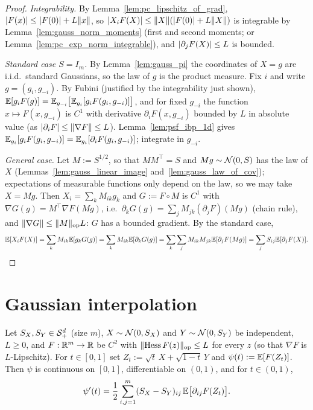 \begin{proof}
\leanok
{}
\emph{Integrability.} By Lemma~\ref{lem:pc_lipschitz_of_grad}, $\lvert F(x) \rvert\le\lvert F(0) \rvert+L\lVert x \rVert$,
so $\lvert X_iF(X) \rvert\le\lVert X \rVert(\lvert F(0) \rvert+L\lVert X \rVert)$ is integrable by
Lemma~\ref{lem:gauss_norm_moments} (first and second moments; or
Lemma~\ref{lem:pc_exp_norm_integrable}), and $\lvert \partial_jF(X) \rvert\le L$ is bounded.

\emph{Standard case $S = I_m$.} By Lemma~\ref{lem:gauss_pi} the coordinates of $X = g$ are
i.i.d.\ standard Gaussians, so the law of $g$ is the product measure. Fix $i$ and write
$g = (g_i, g_{-i})$. By Fubini (justified by the integrability just shown),
$\mathbb{E}[g_iF(g)] = \mathbb{E}_{g_{-i}}\big[\mathbb{E}_{g_i}[g_i F(g_i,g_{-i})]\big]$, and for fixed $g_{-i}$ the
function $x\mapsto F(x,g_{-i})$ is $C^1$ with derivative $\partial_iF(x,g_{-i})$ bounded by
$L$ in absolute value (as $\lvert \partial_iF \rvert\le\lVert \nabla F \rVert\le L$). Lemma~\ref{lem:psf_ibp_1d}
gives $\mathbb{E}_{g_i}[g_iF(g_i,g_{-i})] = \mathbb{E}_{g_i}[\partial_iF(g_i,g_{-i})]$; integrate in $g_{-i}$.

\emph{General case.} Let $M := S^{1/2}$, so that $MM^\top = S$ and $Mg\sim\mathcal{N}(0,S)$ has the
law of $X$ (Lemmas~\ref{lem:gauss_linear_image} and~\ref{lem:gauss_law_of_cov}); expectations
of measurable functions only depend on the law, so we may take $X = Mg$. Then
$X_i = \sum_k M_{ik}g_k$ and $G := F\circ M$ is $C^1$ with
$\nabla G(g) = M^\top\nabla F(Mg)$, i.e.\ $\partial_kG(g) = \sum_j M_{jk}(\partial_jF)(Mg)$
(chain rule), and $\lVert \nabla G \rVert\le\lVert M \rVert_{\mathrm{op}}L$: $G$ has a bounded gradient. By
the standard case,
\[
  \mathbb{E}[X_iF(X)] = \sum_k M_{ik}\mathbb{E}[g_kG(g)] = \sum_k M_{ik}\mathbb{E}[\partial_kG(g)]
  = \sum_k\sum_j M_{ik}M_{jk}\mathbb{E}[\partial_jF(Mg)] = \sum_j S_{ij}\mathbb{E}[\partial_jF(X)].
\]
\end{proof}

\section{Gaussian interpolation}
\label{sec:pre_sudakov_interp}

\begin{lemma}\label{lem:interpolation_derivative}
\leanok
{}
Let $S_X, S_Y \in \mathcal{S}_{+}^{d}$ (size $m$), $X\sim\mathcal{N}(0,S_X)$ and $Y\sim\mathcal{N}(0,S_Y)$ be
independent, $L\ge0$, and $F : \mathbb{R}^m\to\mathbb{R}$ be $C^2$ with
$\lVert \mathrm{Hess}\,F(z) \rVert_{\mathrm{op}}\le L$ for every $z$ (so that $\nabla F$ is
$L$-Lipschitz). For $t\in[0,1]$ set
$Z_t := \sqrt t\,X + \sqrt{1-t}\,Y$ and $\psi(t) := \mathbb{E}[F(Z_t)]$. Then $\psi$ is continuous on
$[0,1]$, differentiable on $(0,1)$, and for $t\in(0,1)$,
\[
  \psi'(t) = \frac12\sum_{i,j=1}^m (S_X - S_Y)_{ij}\,\mathbb{E}\big[\partial_{ij}F(Z_t)\big].
\]
\end{lemma}

